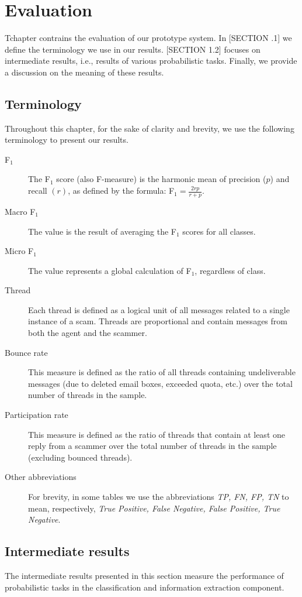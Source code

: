 \chapter{Evaluation}
T\his chapter contrains the evaluation of our prototype system. In [SECTION .1] we define the terminology we use in our results. [SECTION 1.2] focuses on intermediate results, i.e., results of various probabilistic tasks. Finally, we provide a discussion on the meaning of these results.

\section{Terminology}
Throughout this chapter, for the sake of clarity and brevity, we use the following terminology to present our results.
\begin{description}
\item[F$_{1}$] The F$_{1}$ score (also F-measure) is the harmonic mean of precision ($p$) and recall $(r)$, as defined by the formula: F$_{1} = \frac{2rp}{r + p}$.
\item[Macro F$_{1}$] The value is the result of averaging the F$_{1}$ scores for all classes.
\item[Micro F$_{1}$] The value represents a global calculation of F$_{1}$, regardless of class.
\item[Thread] Each thread is defined as a logical unit of all messages related to a single instance of a scam. Threads are proportional and contain messages from both the agent and the scammer.
\item[Bounce rate] This measure is defined as the ratio of all threads containing undeliverable messages (due to deleted email boxes, exceeded quota, etc.) over the total number of threads in the sample.
\item[Participation rate] This measure is defined as the ratio of threads that contain at least one reply from a scammer over the total number of threads in the sample (excluding bounced threads).
\item[Other abbreviations] For brevity, in some tables we use the abbreviations \textit{TP, FN, FP, TN} to mean, respectively, \textit{True Positive, False Negative, False Positive, True Negative}.
\end{description}

\section{Intermediate results}
The intermediate results presented in this section measure the performance of probabilistic tasks in the classification and information extraction component.

